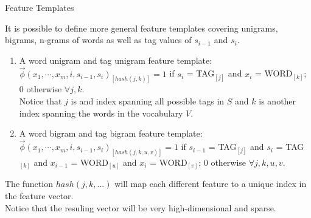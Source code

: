 \documentclass[handout]{beamer}
\begin{document}
\begin{frame}{Feature Templates}
\begin{scriptsize}

It is possible to define more general feature templates covering unigrams, bigrams, n-grams of words as well as tag values of $s_{i-1}$ and $s_i$.

\begin{enumerate}
  
 \item A word unigram and tag unigram feature template: $\vec{\phi}(x_1, \cdots, x_m, i, s_{i-1},s_i)_{[hash(j,k)]}=1$ if $s_i$ = TAG$_{[j]}$ and $x_i$ = WORD$_{[k]}$; 0 otherwise $\forall j,k$. \\ Notice that $j$ is and index spanning all possible tags in $S$ and $k$ is another index spanning the words in the vocabulary $V$.
 
 \item A word bigram and tag bigram feature template: $\vec{\phi}(x_1, \cdots, x_m, i, s_{i-1},s_i)_{[hash(j,k,u,v)]}=1$ if $s_{i-1}$ = TAG$_{[j]}$ and $s_i$ = TAG$_{[k]}$ and $x_{i-1}$ = WORD$_{[u]}$ and $x_{i}$ = WORD$_{[v]}$; 0 otherwise $\forall j,k,u,v$. 
 
 
\end{enumerate}

The function $hash(j,k,...)$ will map each different feature to a unique index in the feature vector.  \\
Notice that the resuling vector will be very high-dimensional and sparse.
\end{scriptsize}
\end{frame}
\end{document}
